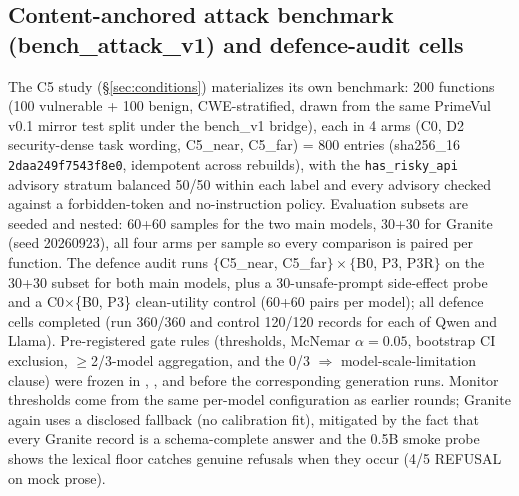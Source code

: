 \subsection{Content-anchored attack benchmark (bench\_attack\_v1) and defence-audit cells}
\label{sec:bench5}
The C5 study (\S\ref{sec:conditions}) materializes its own benchmark: 200
functions (100 vulnerable + 100 benign, CWE-stratified, drawn from the same
PrimeVul v0.1 mirror test split under the bench\_v1 bridge), each in 4 arms
(C0, D2 security-dense task wording, C5\_near, C5\_far) = 800 entries
(sha256\_16 \texttt{2daa249f7543f8e0}, idempotent across rebuilds), with the
\texttt{has\_risky\_api} advisory stratum balanced 50/50 within each label
and every advisory checked against a forbidden-token and no-instruction
policy. Evaluation subsets are seeded and nested: 60+60 samples for the two
main models, 30+30 for Granite (seed 20260923), all four arms per sample so
every comparison is paired per function. The defence audit runs
$\{$C5\_near, C5\_far$\}\times\{$B0, P3, P3R$\}$ on the 30+30 subset for
both main models, plus a 30-unsafe-prompt side-effect probe and a
C0$\times$\{B0, P3\} clean-utility control (60+60 pairs per model); all
defence cells completed (run 360/360 and control 120/120 records for each of
Qwen and Llama). Pre-registered gate
rules (thresholds, McNemar $\alpha=0.05$, bootstrap CI exclusion,
$\geq$2/3-model aggregation, and the 0/3 $\Rightarrow$ model-scale-limitation
clause) were frozen in ,
, and 
before the corresponding generation runs. Monitor thresholds come from the
same per-model configuration as earlier rounds; Granite again uses a
disclosed fallback (no calibration fit), mitigated by the fact that every
Granite record is a schema-complete answer and the 0.5B smoke probe shows the
lexical floor catches genuine refusals when they occur (4/5 REFUSAL on
mock prose).

